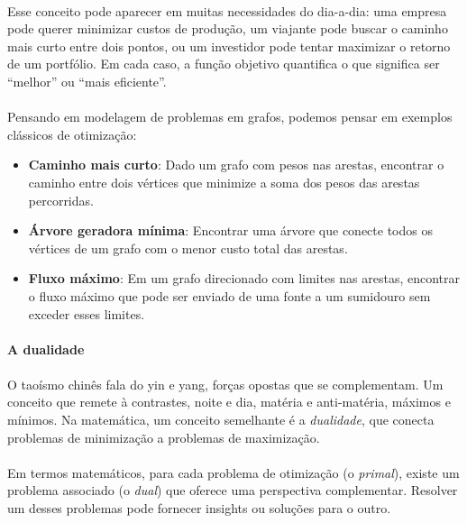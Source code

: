 \documentclass[12pt,a4paper]{article}
\begin{document}
\paragraph{}
Esse conceito pode aparecer em muitas necessidades do dia-a-dia: uma empresa pode querer minimizar custos de produção, um viajante pode buscar o caminho mais curto entre dois pontos, ou um investidor pode tentar maximizar o retorno de um portfólio. Em cada caso, a função objetivo quantifica o que significa ser “melhor” ou “mais eficiente”.

\paragraph{}
Pensando em modelagem de problemas em grafos, podemos pensar em exemplos clássicos de otimização:

\begin{itemize}
    \item \textbf{Caminho mais curto}: Dado um grafo com pesos nas arestas, encontrar o caminho entre dois vértices que minimize a soma dos pesos das arestas percorridas.
    \item \textbf{Árvore geradora mínima}: Encontrar uma árvore que conecte todos os vértices de um grafo com o menor custo total das arestas.
    \item \textbf{Fluxo máximo}: Em um grafo direcionado com limites nas arestas, encontrar o fluxo máximo que pode ser enviado de uma fonte a um sumidouro sem exceder esses limites.
\end{itemize}

\paragraph{A dualidade}

\paragraph{}
O taoísmo chinês fala do yin e yang, forças opostas que se complementam. Um conceito que remete à contrastes, noite e dia, matéria e anti-matéria, máximos e mínimos. Na matemática, um conceito semelhante é a \emph{dualidade}, que conecta problemas de minimização a problemas de maximização.

\paragraph{}
Em termos matemáticos, para cada problema de otimização (o \emph{primal}), existe um problema associado (o \emph{dual}) que oferece uma perspectiva complementar. Resolver um desses problemas pode fornecer insights ou soluções para o outro.
\end{document}
